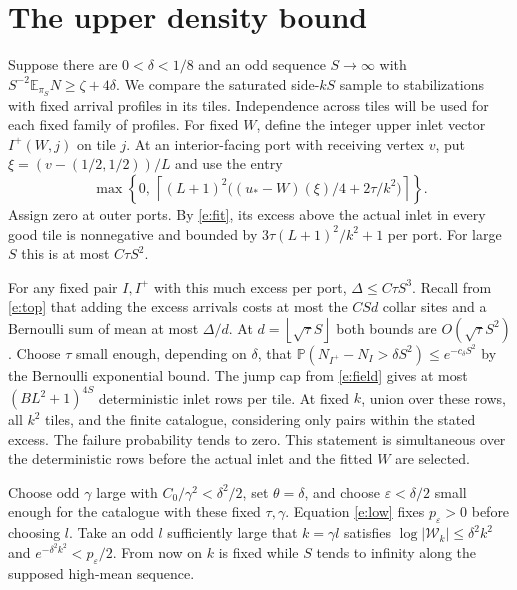 \documentclass[11pt]{amsart}
\newcommand{\E}{\mathbb E}
\newcommand{\Prob}{\mathbb P}
\newcommand{\1}{\mathbf 1}
\newcommand{\floor}[1]{\left\lfloor #1\right\rfloor}
\newcommand{\ceil}[1]{\left\lceil #1\right\rceil}
\begin{document}
\section{The upper density bound}\label{s:upper}

Suppose there are \(0<\delta<1/8\) and an odd sequence \(S\to\infty\) with \(S^{-2}\E_{\pi_S}N\ge\zeta+4\delta\). We compare the saturated side-\(kS\) sample to stabilizations with fixed arrival profiles in its tiles. Independence across tiles will be used for each fixed family of profiles. For fixed \(W\), define the integer upper inlet vector \(I^+(W,j)\) on tile \(j\). At an interior-facing port with receiving vertex \(v\), put \(\xi=(v-(1/2,1/2))/L\) and use the entry
\[
 \max\!\left\{0,\,
 \ceil{(L+1)^2\big((u_*-W)(\xi)/4+2\tau/k^2\big)}\right\}.
\]
Assign zero at outer ports. By \eqref{e:fit}, its excess above the actual inlet in every good tile is nonnegative and bounded by \(3\tau(L+1)^2/k^2+1\) per port. For large \(S\) this is at most \(C\tau S^2\).

For any fixed pair \(I,I^+\) with this much excess per port, \(\Delta\le C\tau S^3\). Recall from \eqref{e:top} that adding the excess arrivals costs at most the \(CSd\) collar sites and a Bernoulli sum of mean at most \(\Delta/d\). At \(d=\floor{\sqrt\tau S}\) both bounds are \(O(\sqrt\tau S^2)\). Choose \(\tau\) small enough, depending on \(\delta\), that \(\Prob(N_{I^+}-N_I>\delta S^2)\le e^{-c_\delta S^2}\) by the Bernoulli exponential bound. The jump cap from \eqref{e:field} gives at most \((B L^2+1)^{4S}\) deterministic inlet rows per tile. At fixed \(k\), union over these rows, all \(k^2\) tiles, and the finite catalogue, considering only pairs within the stated excess. The failure probability tends to zero. This statement is simultaneous over the deterministic rows before the actual inlet and the fitted \(W\) are selected.

Choose odd \(\gamma\) large with \(C_0/\gamma^2<\delta^2/2\), set \(\theta=\delta\), and choose \(\varepsilon<\delta/2\) small enough for the catalogue with these fixed \(\tau,\gamma\). Equation \eqref{e:low} fixes \(p_\varepsilon>0\) before choosing \(l\). Take an odd \(l\) sufficiently large that \(k=\gamma l\) satisfies \(\log|\mathcal W_k|\le\delta^2 k^2\) and \(e^{-\delta^2 k^2}<p_\varepsilon/2\). From now on \(k\) is fixed while \(S\) tends to infinity along the supposed high-mean sequence.
\end{document}
